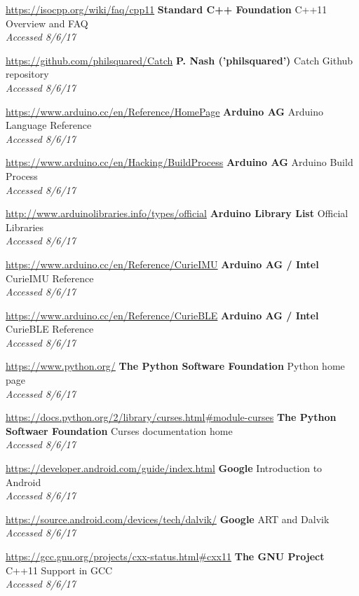 \documentclass[a4paper]{article}
\begin{document}
\begin{thebibliography}{9}
\url{https://isocpp.org/wiki/faq/cpp11}
\textbf{Standard C++ Foundation}
C++11 Overview and FAQ
\\\textit{Accessed 8/6/17}

\url{https://github.com/philsquared/Catch}
\textbf{P. Nash ('philsquared')}
Catch Github repository
\\\textit{Accessed 8/6/17}

\url{https://www.arduino.cc/en/Reference/HomePage}
\textbf{Arduino AG}
Arduino Language Reference
\\\textit{Accessed 8/6/17}

\url{https://www.arduino.cc/en/Hacking/BuildProcess}
\textbf{Arduino AG}
Arduino Build Process
\\\textit{Accessed 8/6/17}


\url{http://www.arduinolibraries.info/types/official}
\textbf{Arduino Library List}
Official Libraries
\\\textit{Accessed 8/6/17}

\url{https://www.arduino.cc/en/Reference/CurieIMU}
\textbf{Arduino AG / Intel}
CurieIMU Reference
\\\textit{Accessed 8/6/17}

\url{https://www.arduino.cc/en/Reference/CurieBLE}
\textbf{Arduino AG / Intel}
CurieBLE Reference
\\\textit{Accessed 8/6/17}

\url{https://www.python.org/}
\textbf{The Python Software Foundation}
Python home page
\\\textit{Accessed 8/6/17}

\url{https://docs.python.org/2/library/curses.html#module-curses}
\textbf{The Python Softwaer Foundation}
Curses documentation home
\\\textit{Accessed 8/6/17}

\url{https://developer.android.com/guide/index.html}
\textbf{Google}
Introduction to Android
\\\textit{Accessed 8/6/17}

\url{https://source.android.com/devices/tech/dalvik/}
\textbf{Google}
ART and Dalvik
\\\textit{Accessed 8/6/17}

\url{https://gcc.gnu.org/projects/cxx-status.html#cxx11}
\textbf{The GNU Project}
C++11 Support in GCC
\\\textit{Accessed 8/6/17}


\end{thebibliography}
\end{document}
